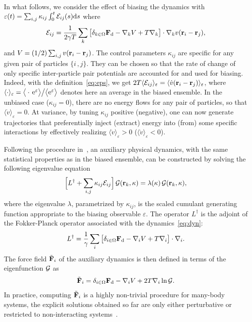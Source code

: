 \documentclass[pre, superscriptaddress, twocolumn,pre]{revtex4-1}
\begin{document}
In what follows, we consider the effect of biasing the dynamics with $\varepsilon(t)=\sum_{i,j} \kappa_{ij}\int_0^t{\cal E}_{ij}(s){\rm d}s$ where 
\begin{equation}\label{eq:eps}
	{\cal E}_{ij} = \frac{1}{2\gamma T}\sum_k\big[ \delta_{k\in\Omega}{\bf F}_{\rm d} - \nabla_k V + T \nabla_k\big] \cdot\nabla_k v({\bf r}_i-{\bf r}_j) ,
\end{equation}
and $V=(1/2)\sum_{i,j}v({\bf r}_i-{\bf r}_j)$. The control parameters $\kappa_{ij}$ are specific for any given pair of particles $\{i\,,j\}$. They can be chosen so that the rate of change of only specific inter-particle pair potentials are accounted for and used for biasing. Indeed, with the definition~\eqref{eq:eps}, we get $2T\langle{\cal E}_{ij}\rangle_\varepsilon = \langle\dot v({\bf r}_i-{\bf r}_j)\rangle_\varepsilon$, where $\langle\cdot\rangle_\varepsilon=\big\langle\cdot\,{\rm e}^\varepsilon\big\rangle\big/\big\langle{\rm e}^\varepsilon\big\rangle$ denotes here an average in the biased ensemble. In the unbiased case ($\kappa_{ij}=0$), there are no energy flows for any pair of particles, so that $\langle\dot v\rangle_\varepsilon = 0$. At variance, by tuning $\kappa_{ij}$ positive (negative), one can now generate trajectories that preferentially inject (extract) energy into (from) some specific interactions by effectively realizing $\langle\dot v\rangle_\varepsilon>0$ ($\langle\dot v\rangle_\varepsilon<0$).


Following the procedure in~\cite{Jack2010,Chetrite2013}, an auxiliary physical dynamics, with the same statistical properties as in the biased ensemble, can be constructed by solving the following eigenvalue equation 
\begin{equation}\label{eq:adjointbiased}
	\Big[L^\dagger + \sum_{i,j}\kappa_{ij}{\cal E}_{ij}\Big]\,{\cal G}({\bf r}_k,\kappa) = \lambda(\kappa)\,{\cal G}({\bf r}_k,\kappa) ,
\end{equation}
where the eigenvalue $\lambda$, parametrized by $\kappa_{ij}$, is the scaled cumulant generating function appropriate to the biasing observable $\varepsilon$. The operator $L^\dagger$ is the adjoint of the Fokker-Planck operator associated with the dynamics~\eqref{eq:dyn}:
\begin{equation}\label{eq:L}
	L^\dagger = \frac{1}{\gamma} \sum_i\big[ \delta_{i\in\Omega}{\bf F}_{\rm d} - \nabla_i V + T \nabla_i\big] \cdot\nabla_i .
\end{equation}
The force field $\tilde{\bf F}_i$ of the auxiliary dynamics is then defined in terms of the eigenfunction ${\cal G}$ as 
\begin{equation}
	\tilde{\bf F}_i = \delta_{i\in\Omega}{\bf F}_{\rm d} - \nabla_iV + 2 T \nabla_i \ln{\cal G} .
\end{equation}
In practice, computing $\tilde {\bf F}_i$ is a highly non-trivial procedure for many-body systems, the explicit solutions obtained so far are only either perturbative or restricted to non-interacting systems~\cite{Chetrite2013, Touchette2016}.
\end{document}
